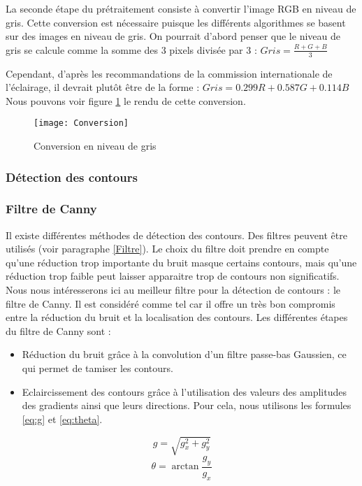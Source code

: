 La seconde étape du prétraitement consiste à convertir l’image RGB en niveau de gris. Cette conversion est nécessaire puisque les différents algorithmes se basent sur des images en niveau de gris. On pourrait d’abord penser que le niveau de gris se calcule comme la somme des 3 pixels divisée par 3 : $Gris = \frac{R + G + B}{3}$

Cependant, d’après les recommandations de la commission internationale de l’éclairage, il devrait plutôt être de la forme : $Gris = 0.299R + 0.587G + 0.114B$
Nous pouvons voir figure \ref{fig:Conversion} le rendu de cette conversion.

\begin{figure}[h]
  \centering
  \texttt{[image: Conversion]}
  \caption{Conversion en niveau de gris}
  \label{fig:Conversion}
\end{figure}

\subsubsection{Détection des contours}

\subsubsection*{Filtre de Canny}

Il existe différentes méthodes de détection des contours. Des filtres peuvent être utilisés (voir paragraphe \ref{Filtre}). Le choix du filtre doit prendre en compte qu’une réduction trop importante du bruit masque certains contours, mais qu’une réduction trop faible peut laisser apparaitre trop de contours non significatifs. Nous nous intéresserons ici au meilleur filtre pour la détection de contours : le filtre de Canny. Il est considéré comme tel car il offre un très bon compromis entre la réduction du bruit et la localisation des contours. Les différentes étapes du filtre de Canny sont :
\begin{itemize}[label=\textbullet,font=\color{black}]
\item Réduction du bruit grâce à la convolution d’un filtre passe-bas Gaussien, ce qui permet de tamiser les contours.
\item Eclaircissement des contours grâce à l’utilisation des valeurs des amplitudes des gradients ainsi que leurs directions. Pour cela, nous utilisons les formules \eqref{eq:g} et \eqref{eq:theta}.
\end{itemize}

\begin{equation}
g = \sqrt{g_x^2 + g_y^2}
\label{eq:g}
\end{equation}
\begin{equation}
\theta = \arctan{\frac{g_y}{g_x}}
\label{eq:theta}
\end{equation}

